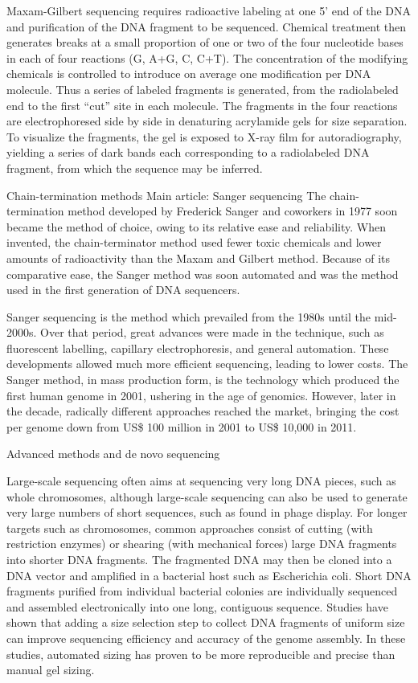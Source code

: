 Maxam-Gilbert sequencing requires radioactive labeling at one 5' end of the DNA and purification of the DNA fragment to be sequenced. Chemical treatment then generates breaks at a small proportion of one or two of the four nucleotide bases in each of four reactions (G, A+G, C, C+T). The concentration of the modifying chemicals is controlled to introduce on average one modification per DNA molecule. Thus a series of labeled fragments is generated, from the radiolabeled end to the first ``cut'' site in each molecule. The fragments in the four reactions are electrophoresed side by side in denaturing acrylamide gels for size separation. To visualize the fragments, the gel is exposed to X-ray film for autoradiography, yielding a series of dark bands each corresponding to a radiolabeled DNA fragment, from which the sequence may be inferred.

Chain-termination methods
Main article: Sanger sequencing
The chain-termination method developed by Frederick Sanger and coworkers in 1977 soon became the method of choice, owing to its relative ease and reliability. When invented, the chain-terminator method used fewer toxic chemicals and lower amounts of radioactivity than the Maxam and Gilbert method. Because of its comparative ease, the Sanger method was soon automated and was the method used in the first generation of DNA sequencers.

Sanger sequencing is the method which prevailed from the 1980s until the mid-2000s. Over that period, great advances were made in the technique, such as fluorescent labelling, capillary electrophoresis, and general automation. These developments allowed much more efficient sequencing, leading to lower costs. The Sanger method, in mass production form, is the technology which produced the first human genome in 2001, ushering in the age of genomics. However, later in the decade, radically different approaches reached the market, bringing the cost per genome down from US\$ 100 million in 2001 to US\$ 10,000 in 2011.

Advanced methods and de novo sequencing

Large-scale sequencing often aims at sequencing very long DNA pieces, such as whole chromosomes, although large-scale sequencing can also be used to generate very large numbers of short sequences, such as found in phage display. For longer targets such as chromosomes, common approaches consist of cutting (with restriction enzymes) or shearing (with mechanical forces) large DNA fragments into shorter DNA fragments. The fragmented DNA may then be cloned into a DNA vector and amplified in a bacterial host such as Escherichia coli. Short DNA fragments purified from individual bacterial colonies are individually sequenced and assembled electronically into one long, contiguous sequence. Studies have shown that adding a size selection step to collect DNA fragments of uniform size can improve sequencing efficiency and accuracy of the genome assembly. In these studies, automated sizing has proven to be more reproducible and precise than manual gel sizing.


